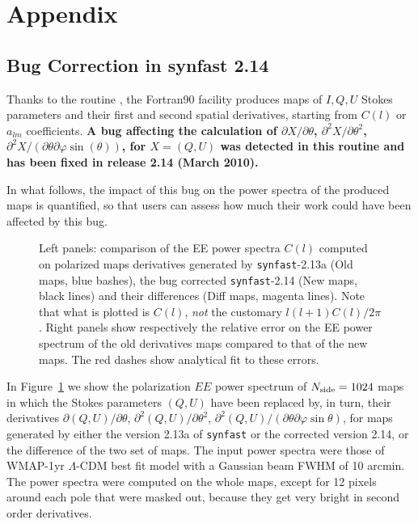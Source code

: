 \section[Appendix]{Appendix}
\label{fac:appendix}
\subsection{Bug Correction in synfast 2.14}
\label{fac:sec:bug_synder}
Thanks to the routine , the Fortran90 
facility  produces
maps of $I,Q,U$ Stokes parameters and their first and second spatial derivatives,
starting from $C(l)$ or $a_{lm}$ coefficients.
{\bf A bug affecting the calculation of $\partial X/\partial\theta$, 
$\partial^2 X/\partial \theta^2$, 
$\partial^2 X/(\partial\theta\partial\varphi\sin(\theta))$, for $X=(Q,U)$
was detected in this routine and has been fixed in release 2.14 (March 2010).}

In what follows, the impact of this bug on the power spectra of
the produced maps is quantified, so that users can
assess how much their work could have been affected by this bug.

\begin{figure}[hb]
\caption[Derivatives power spectra]{%
\label{fig:bug_derQU}\latexhtml{\footnotesize}{}%
Left panels: comparison of the EE power spectra $C(l)$ computed on polarized maps
derivatives generated by
{\tt synfast}-2.13a (Old maps, blue bashes), the bug corrected {\tt synfast}-2.14 (New maps, black lines)
and their differences (Diff maps, magenta lines). Note that what is plotted is
$C(l)$, {\em not} the customary $l(l+1)C(l)/2\pi$. Right panels show respectively
the relative error on the EE power spectrum of the old derivatives maps compared
to that of the new maps.
The red dashes show analytical fit to these errors.
}
\end{figure}
In Figure~\ref{fig:bug_derQU} we show the polarization $EE$ power spectrum of
$N_{\rm side} = 1024$ maps
in which the Stokes parameters $(Q,U)$ have been replaced by, in turn, their derivatives
$\partial (Q,U)/\partial\theta$, 
$\partial^2 (Q,U)/\partial \theta^2$, 
$\partial^2 (Q,U)/(\partial\theta\partial\varphi\sin\theta)$, 
for maps generated
by either the version 2.13a of {\tt synfast} or the corrected version 2.14, or
the difference of the two set of maps.
The input power spectra were those of WMAP-1yr $\Lambda$-CDM best fit model with a Gaussian
beam FWHM of 10 arcmin. The power spectra were computed on the whole maps, except
for 12 pixels around each pole that were masked out, because they get very
bright in second order derivatives.


